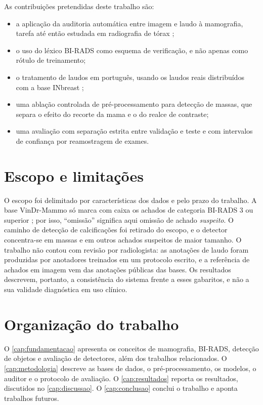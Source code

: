 As contribuições pretendidas deste trabalho são:

\begin{itemize}
  \item a aplicação da auditoria automática entre imagem e laudo à mamografia, tarefa até então estudada em radiografia de tórax \cite{mahmood2025factcheck, zou2025corbenchx};
  \item o uso do léxico BI-RADS como esquema de verificação, e não apenas como rótulo de treinamento;
  \item o tratamento de laudos em português, usando os laudos reais distribuídos com a base INbreast \cite{moreira2012inbreast};
  \item uma ablação controlada de pré-processamento para detecção de massas, que separa o efeito do recorte da mama e o do realce de contraste;
  \item uma avaliação com separação estrita entre validação e teste e com intervalos de confiança por reamostragem de exames.
\end{itemize}

\section{Escopo e limitações}

O escopo foi delimitado por características dos dados e pelo prazo do trabalho. A base VinDr-Mammo só marca com caixa os achados de categoria BI-RADS 3 ou superior \cite{nguyen2023vindr}; por isso, ``omissão'' significa aqui omissão de achado \textit{suspeito}. O caminho de detecção de calcificações foi retirado do escopo, e o detector concentra-se em massas e em outros achados suspeitos de maior tamanho. O trabalho não contou com revisão por radiologista: as anotações de laudo foram produzidas por anotadores treinados em um protocolo escrito, e a referência de achados em imagem vem das anotações públicas das bases. Os resultados descrevem, portanto, a consistência do sistema frente a esses gabaritos, e não a sua validade diagnóstica em uso clínico.

\section{Organização do trabalho}

O \autoref{cap:fundamentacao} apresenta os conceitos de mamografia, BI-RADS, detecção de objetos e avaliação de detectores, além dos trabalhos relacionados. O \autoref{cap:metodologia} descreve as bases de dados, o pré-processamento, os modelos, o auditor e o protocolo de avaliação. O \autoref{cap:resultados} reporta os resultados, discutidos no \autoref{cap:discussao}. O \autoref{cap:conclusao} conclui o trabalho e aponta trabalhos futuros.
